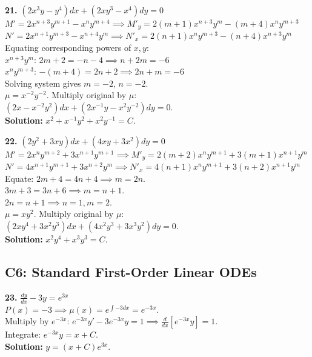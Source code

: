 \documentclass[11pt]{article}
\begin{document}
\vspace{0.5cm}
\textbf{21.} $(2x^3 y - y^4) dx + (2xy^3 - x^4) dy = 0$ \\
$M' = 2x^{n+3}y^{m+1} - x^n y^{m+4} \implies M'_y = 2(m+1)x^{n+3}y^m - (m+4)x^n y^{m+3}$ \\
$N' = 2x^{n+1}y^{m+3} - x^{n+4}y^m \implies N'_x = 2(n+1)x^n y^{m+3} - (n+4)x^{n+3}y^m$ \\
Equating corresponding powers of $x,y$: \\
$x^{n+3}y^m$: $2m+2 = -n-4 \implies n + 2m = -6$ \\
$x^n y^{m+3}$: $-(m+4) = 2n+2 \implies 2n + m = -6$ \\
Solving system gives $m = -2$, $n = -2$. \\
$\mu = x^{-2}y^{-2}$. Multiply original by $\mu$: \\
$(2x - x^{-2}y^2) dx + (2x^{-1}y - x^2 y^{-2}) dy = 0$. \\
\textbf{Solution:} $x^2 + x^{-1}y^2 + x^2 y^{-1} = C$.

\vspace{0.5cm}
\textbf{22.} $(2y^2 + 3xy) dx + (4xy + 3x^2) dy = 0$ \\
$M' = 2x^n y^{m+2} + 3x^{n+1}y^{m+1} \implies M'_y = 2(m+2)x^n y^{m+1} + 3(m+1)x^{n+1}y^m$ \\
$N' = 4x^{n+1}y^{m+1} + 3x^{n+2}y^m \implies N'_x = 4(n+1)x^n y^{m+1} + 3(n+2)x^{n+1}y^m$ \\
Equate: $2m+4 = 4n+4 \implies m = 2n$. \\
$3m+3 = 3n+6 \implies m = n+1$. \\
$2n = n+1 \implies n = 1, m = 2$. \\
$\mu = xy^2$. Multiply original by $\mu$: \\
$(2xy^4 + 3x^2y^3) dx + (4x^2y^3 + 3x^3y^2) dy = 0$. \\
\textbf{Solution:} $x^2 y^4 + x^3 y^3 = C$.

\subsection*{C6: Standard First-Order Linear ODEs}

\textbf{23.} $\frac{dy}{dx} - 3y = e^{3x}$ \\
$P(x) = -3 \implies \mu(x) = e^{\int -3 dx} = e^{-3x}$. \\
Multiply by $e^{-3x}$: $e^{-3x} y' - 3e^{-3x} y = 1 \implies \frac{d}{dx}[e^{-3x} y] = 1$. \\
Integrate: $e^{-3x} y = x + C$. \\
\textbf{Solution:} $y = (x + C)e^{3x}$.
\end{document}
